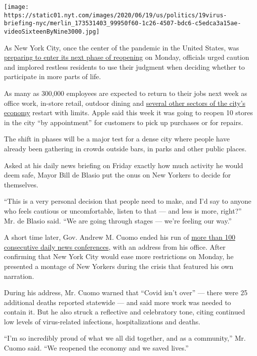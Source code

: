 \texttt{[image: https://static01.nyt.com/images/2020/06/19/us/politics/19virus-briefing-nyc/merlin\_173531403\_99950f60-1c26-4507-bdc6-c5edca3a15ae-videoSixteenByNine3000.jpg]}

As New York City, once the center of the pandemic in the United States,
was
\href{https://www.nytimes.com/2020/06/18/nyregion/phase-2-reopening-nyc.html}{preparing
to enter its next phase of reopening} on Monday, officials urged caution
and implored restless residents to use their judgment when deciding
whether to participate in more parts of life.

As many as 300,000 employees are expected to return to their jobs next
week as office work, in-store retail, outdoor dining and
\href{https://www.nytimes.com/article/new-york-phase-reopening.html}{several
other sectors of the city's economy} restart with limits. Apple said
this week it was going to reopen 10 stores in the city ``by
appointment'' for customers to pick up purchases or for repairs.

The shift in phases will be a major test for a dense city where people
have already been gathering in crowds outside bars, in parks and other
public places.

Asked at his daily news briefing on Friday exactly how much activity he
would deem safe, Mayor Bill de Blasio put the onus on New Yorkers to
decide for themselves.

``This is a very personal decision that people need to make, and I'd say
to anyone who feels cautious or uncomfortable, listen to that --- and
less is more, right?'' Mr. de Blasio said. ``We are going through stages
--- we're feeling our way.''

A short time later, Gov. Andrew M. Cuomo ended his run of
\href{https://www.nytimes.com/2020/06/14/insider/andrew-cuomo-briefings.html}{more
than 100 consecutive daily news conferences}, with an address from his
office. After confirming that New York City would ease more restrictions
on Monday, he presented a montage of New Yorkers during the crisis that
featured his own narration.

During his address, Mr. Cuomo warned that ``Covid isn't over'' --- there
were 25 additional deaths reported statewide --- and said more work was
needed to contain it. But he also struck a reflective and celebratory
tone, citing continued low levels of virus-related infections,
hospitalizations and deaths.

``I'm so incredibly proud of what we all did together, and as a
community,'' Mr. Cuomo said. ``We reopened the economy and we saved
lives.''

